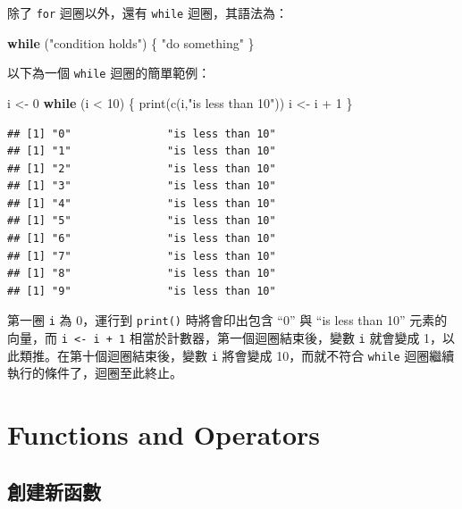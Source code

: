 \documentclass[
]{book}
\newenvironment{Shaded}{\begin{snugshade}}{\end{snugshade}}
\newcommand{\ControlFlowTok}[1]{\textcolor[rgb]{0.13,0.29,0.53}{\textbf{#1}}}
\newcommand{\DecValTok}[1]{\textcolor[rgb]{0.00,0.00,0.81}{#1}}
\newcommand{\FunctionTok}[1]{\textcolor[rgb]{0.00,0.00,0.00}{#1}}
\newcommand{\NormalTok}[1]{#1}
\newcommand{\OtherTok}[1]{\textcolor[rgb]{0.56,0.35,0.01}{#1}}
\newcommand{\SpecialCharTok}[1]{\textcolor[rgb]{0.00,0.00,0.00}{#1}}
\newcommand{\StringTok}[1]{\textcolor[rgb]{0.31,0.60,0.02}{#1}}
\theoremstyle{definition}
\theoremstyle{remark}
\begin{document}
除了 \texttt{for} 迴圈以外，還有 \texttt{while} 迴圈，其語法為：

\begin{Shaded}
\begin{Highlighting}[]
\ControlFlowTok{while}\NormalTok{ (}\StringTok{"condition holds"}\NormalTok{) \{ }
  \StringTok{"do something"}
\NormalTok{\}}
\end{Highlighting}
\end{Shaded}

以下為一個 \texttt{while} 迴圈的簡單範例：

\begin{Shaded}
\begin{Highlighting}[]
\NormalTok{i }\OtherTok{\textless{}{-}} \DecValTok{0}
\ControlFlowTok{while}\NormalTok{ (i }\SpecialCharTok{\textless{}} \DecValTok{10}\NormalTok{) \{}
  \FunctionTok{print}\NormalTok{(}\FunctionTok{c}\NormalTok{(i,}\StringTok{"is less than 10"}\NormalTok{))}
\NormalTok{  i }\OtherTok{\textless{}{-}}\NormalTok{ i }\SpecialCharTok{+} \DecValTok{1}
\NormalTok{\}}
\end{Highlighting}
\end{Shaded}

\begin{verbatim}
## [1] "0"               "is less than 10"
## [1] "1"               "is less than 10"
## [1] "2"               "is less than 10"
## [1] "3"               "is less than 10"
## [1] "4"               "is less than 10"
## [1] "5"               "is less than 10"
## [1] "6"               "is less than 10"
## [1] "7"               "is less than 10"
## [1] "8"               "is less than 10"
## [1] "9"               "is less than 10"
\end{verbatim}

第一圈 \texttt{i} 為 0，運行到 \texttt{print()} 時將會印出包含 ``0'' 與 ``is less than 10'' 元素的向量，而 \texttt{i\ \textless{}-\ i\ +\ 1} 相當於計數器，第一個迴圈結束後，變數 \texttt{i} 就會變成 1，以此類推。在第十個迴圈結束後，變數 \texttt{i} 將會變成 10，而就不符合 \texttt{while} 迴圈繼續執行的條件了，迴圈至此終止。

\hypertarget{functions-and-operators}{%
\section{Functions and Operators}\label{functions-and-operators}}

\hypertarget{ux5275ux5efaux65b0ux51fdux6578}{%
\subsection{創建新函數}\label{ux5275ux5efaux65b0ux51fdux6578}}
\end{document}

